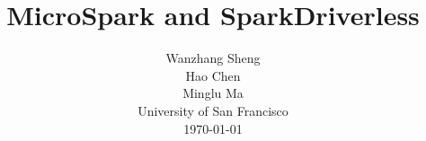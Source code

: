 \documentclass[twocolumn]{article}
\title{MicroSpark and SparkDriverless}
\author{Wanzhang Sheng \\
Hao Chen \\
Minglu Ma \\
University of San Francisco\\
\today \\
}
\begin{document}
\maketitle










\small


\end{document}
